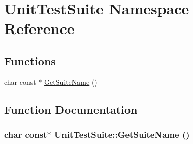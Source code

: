 \hypertarget{namespace_unit_test_suite}{
\section{UnitTestSuite Namespace Reference}
\label{namespace_unit_test_suite}
}
\subsection*{Functions}
\begin{CompactItemize}
\item 
char const $\ast$ \hyperlink{namespace_unit_test_suite_fed7a44f1e6251d5387dfabf0844fb3a}{GetSuiteName} ()
\end{CompactItemize}


\subsection{Function Documentation}
\hypertarget{namespace_unit_test_suite_fed7a44f1e6251d5387dfabf0844fb3a}{
\subsubsection[{GetSuiteName}]{\setlength{\rightskip}{0pt plus 5cm}char const$\ast$ UnitTestSuite::GetSuiteName ()}}
\label{namespace_unit_test_suite_fed7a44f1e6251d5387dfabf0844fb3a}


